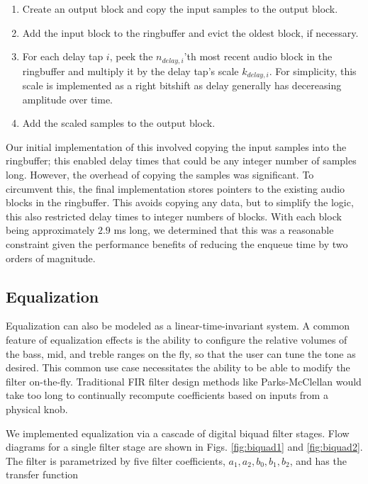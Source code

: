 \documentclass[conference]{IEEEtran}
\begin{document}
\begin{enumerate}
    \item Create an output block and copy the input samples to the output block.
    \item Add the input block to the ringbuffer and evict the oldest block, if necessary.
    \item For each delay tap $i$, peek the $n_{delay,i}$'th most recent audio block in the ringbuffer and multiply it by the delay tap's scale $k_{delay,i}$. For simplicity, this scale is implemented as a right bitshift as delay generally has decereasing amplitude over time.
    \item Add the scaled samples to the output block.
\end{enumerate}

Our initial implementation of this involved copying the input samples into the ringbuffer; this enabled delay times that could be any integer number of samples long. However, the overhead of copying the samples was significant. To circumvent this, the final implementation stores pointers to the existing audio blocks in the ringbuffer. This avoids copying any data, but to simplify the logic, this also restricted delay times to integer numbers of blocks. With each block being approximately $2.9$ ms long, we determined that this was a reasonable constraint given the performance benefits of reducing the enqueue time by two orders of magnitude.

\subsection{Equalization}

Equalization can also be modeled as a linear-time-invariant system. A common feature of equalization effects is the ability to configure the relative volumes of the bass, mid, and treble ranges on the fly, so that the user can tune the tone as desired. This common use case necessitates the ability to be able to modify the filter on-the-fly. Traditional FIR filter design methods like Parks-McClellan would take too long to continually recompute coefficients based on inputs from a physical knob.

We implemented equalization via a cascade of digital biquad filter stages. Flow diagrams for a single filter stage are shown in Figs. \ref{fig:biquad1} and \ref{fig:biquad2}. The filter is parametrized by five filter coefficients, $a_1, a_2, b_0, b_1, b_2$, and has the transfer function
\end{document}
